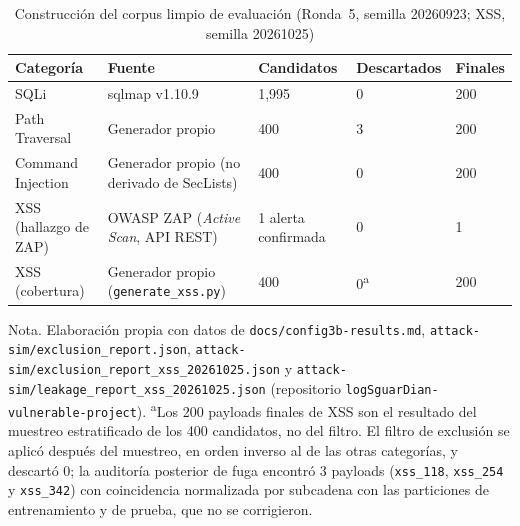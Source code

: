 \begin{table}[H]
\centering
\small
\begin{tabular}{|L{2.7cm}|L{4.2cm}|L{1.8cm}|L{1.8cm}|L{1.4cm}|}
\hline
\textbf{Categoría} & \textbf{Fuente} & \textbf{Candidatos} & \textbf{Descartados} & \textbf{Finales} \\ \hline
SQLi & sqlmap v1.10.9 & 1{,}995 & 0 & 200 \\ \hline
Path Traversal & Generador propio & 400 & 3 & 200 \\ \hline
Command Injection & Generador propio (no derivado de SecLists) & 400 & 0 & 200 \\ \hline
XSS (hallazgo de ZAP) & OWASP ZAP (\textit{Active Scan}, API REST) & 1 alerta confirmada & 0 & 1 \\ \hline
XSS (cobertura) & Generador propio (\texttt{generate\_xss.py}) & 400 & 0\textsuperscript{a} & 200 \\ \hline
\end{tabular}
\caption[Construcción del corpus limpio]{Construcción del corpus limpio de evaluación (Ronda~5, semilla 20260923; XSS, semilla 20261025)}
\label{tab:res-corpus}
\end{table}
{\footnotesize Nota. Elaboración propia con datos de \texttt{docs/config3b-results.md},
\texttt{attack-sim/exclusion\_report.json}, \texttt{attack-sim/exclusion\_report\_xss\_20261025.json}
y \texttt{attack-sim/leakage\_report\_xss\_20261025.json} (repositorio
\texttt{logSguarDian-vulnerable-project}). \textsuperscript{a}Los 200 payloads finales de XSS son
el resultado del muestreo estratificado de los 400 candidatos, no del filtro. El filtro de exclusión
se aplicó después del muestreo, en orden inverso al de las otras categorías, y descartó 0; la
auditoría posterior de fuga encontró 3 payloads (\texttt{xss\_118}, \texttt{xss\_254} y
\texttt{xss\_342}) con coincidencia normalizada por subcadena con las particiones de entrenamiento y
de prueba, que no se corrigieron.}

